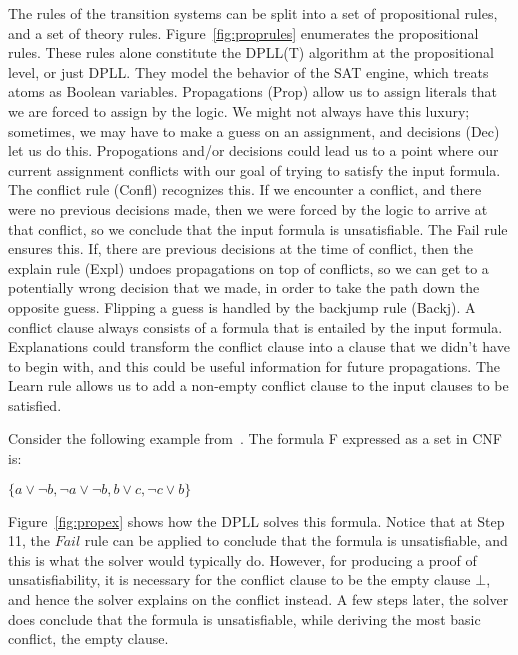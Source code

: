 \documentclass{article}
\begin{document}
The rules of the transition systems can be split into a 
set of propositional rules, and a set of theory rules. 
Figure~\ref{fig:proprules} enumerates the propositional rules.
These rules alone constitute the DPLL(T) algorithm at the
propositional level, or just DPLL.
They model the behavior of the SAT engine, 
which treats atoms
as Boolean variables. Propagations (Prop) allow us to assign 
literals that we are forced to assign by the logic. We 
might not always have this luxury; sometimes, we may have 
to make a guess on an assignment, and decisions (Dec) let us do 
this. Propogations and/or decisions could lead us to 
a point where our current assignment conflicts with 
our goal of trying to satisfy the input formula. The 
conflict rule (Confl) recognizes this. If we encounter a conflict, 
and there were no previous decisions made, then we were 
forced by the logic to arrive at that conflict, so we 
conclude that the input formula is unsatisfiable. The Fail 
rule ensures this. If, there are previous decisions at
the time of conflict, then the explain rule (Expl) undoes 
propagations on top of conflicts, so we can get to a 
potentially wrong decision that we made, in order to
take the path down the opposite guess. Flipping a guess 
is handled by the backjump rule (Backj). A conflict clause always 
consists of a formula that is entailed by the input formula. 
Explanations could transform the conflict 
clause into a clause that we didn't have to begin with, 
and this could be useful information for future propagations. 
The Learn rule allows us 
to add a non-empty conflict clause to the input clauses to be 
satisfied. 

Consider the following example from~\cite{DBLP:conf/fmcad/2016}.
The formula F expressed as a set in CNF is:
\begin{center}
$\{a \lor \neg b, \neg a \lor \neg b, b \lor c, \neg c \lor b\}$
\end{center}
Figure~\ref{fig:propex} shows how the DPLL solves this 
formula. Notice that at Step 11, the $Fail$ rule can be 
applied to conclude that the formula is unsatisfiable, and 
this is what the solver would typically do. However, for 
producing a proof of unsatisfiability, it is necessary for the 
conflict clause to be the empty clause $\bot$, and hence the 
solver explains on the conflict instead. A few steps later, 
the solver does conclude that the formula is unsatisfiable, 
while deriving the most basic conflict, the empty clause.
\end{document}
